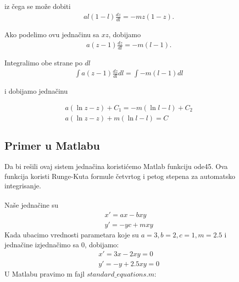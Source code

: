 \documentclass[a4paper]{article}
\begin{document}
iz čega se može dobiti
\begin{displaymath}
    \begin{aligned}
        al(1 - l) \frac{dz}{dl} = -mz(1 - z).
    \end{aligned}
\end{displaymath}

Ako podelimo ovu jednačinu sa $xz$, dobijamo
\begin{displaymath}
    \begin{aligned}
        a(z - 1) \frac{dz}{dl} = -m(l - 1).
    \end{aligned}
\end{displaymath}

Integralimo obe strane po $dl$
\begin{displaymath}
    \begin{aligned}
        \int a(z - 1) \frac{dz}{dl} dl= \int -m(l - 1) dl
    \end{aligned}
\end{displaymath}

i dobijamo jednačinu

\begin{displaymath}
    \begin{aligned}
        a(\ln z -z) + C_1 = -m(\ln l - l) + C_2\\
        a(\ln z -z) + m(\ln l - l) = C
    \end{aligned}
\end{displaymath}

\subsection{Primer u Matlabu}
\label{sub:std_primer}
Da bi rešili ovaj sistem jednačina koristićemo Matlab funkciju ode45. Ova funkcija koristi Runge-Kuta
formule četvrtog i petog stepena za automatsko integrisanje.\\ \\
Naše jednačine su
    \begin{equation}
        \begin{aligned}
            x' = ax - bxy \\
            y' = -yc + mxy
        \end{aligned}
	\end{equation}
Kada ubacimo vrednosti parametara koje su $a=3, b=2, c=1, m=2.5$ i jednačine izjednačimo sa 0, dobijamo:
    \begin{equation}
        \begin{aligned}
            x'=3x - 2xy = 0 \\
            y'=-y + 2.5xy = 0
        \end{aligned}
	\end{equation}
U Matlabu pravimo m fajl $ standard\_equations.m $:
\end{document}
